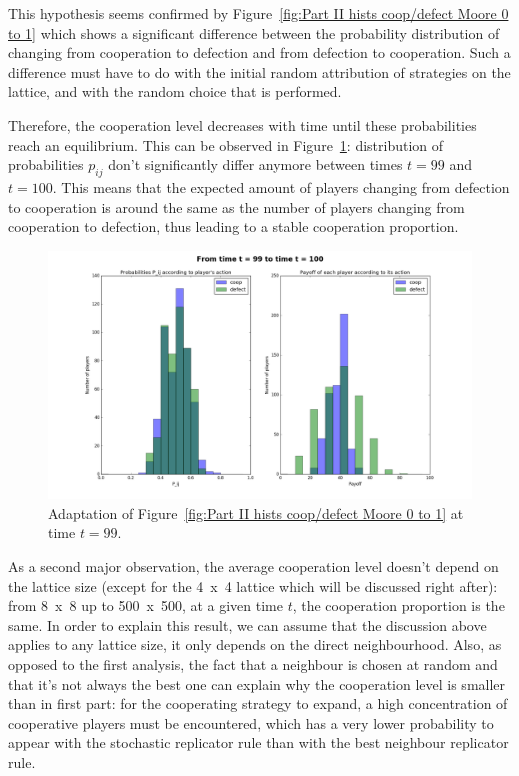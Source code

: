 \documentclass{article}
\begin{document}
This hypothesis seems confirmed by Figure~\ref{fig:Part II hists coop/defect Moore 0 to 1} which shows a
significant difference between the probability distribution of changing from cooperation to defection and
from defection to cooperation. Such a difference must have to do with the initial random attribution of
strategies on the lattice, and with the random choice that is performed.

Therefore, the cooperation level decreases with time until these probabilities reach an equilibrium. This
can be observed in Figure~\ref{fig:Part II hists coop/defect Moore 99 to 100}: distribution of probabilities
$p_{ij}$ don't significantly differ anymore between times $t=99$ and $t=100$. This means that the expected
amount of players changing from defection to cooperation is around the same as the number of players changing
from cooperation to defection, thus leading to a stable cooperation proportion.

\begin{figure}[!h]
\hspace{-1.8cm}
\includegraphics[width=1.2\textwidth]{imgs/part2_diff_coop_defect_99_to_100.png}
\vspace{-1cm}
\caption{Adaptation of Figure~\ref{fig:Part II hists coop/defect Moore 0 to 1} at time $t=99$.
\label{fig:Part II hists coop/defect Moore 99 to 100}}
\end{figure}

As a second major observation, the average cooperation level doesn't depend on the lattice size (except
for the 4~x~4 lattice which will be discussed right after): from 8~x~8 up to 500~x~500, at a given time $t$,
the cooperation proportion is the same. In order to explain this result, we can assume that the discussion
above applies to any lattice size, it only depends on the direct neighbourhood. Also, as opposed to the
first analysis, the fact that a neighbour is chosen at random and that it's not always the best one can
explain why the cooperation level is smaller than in first part: for the cooperating strategy to expand,
a high concentration of cooperative players must be encountered, which has a very lower probability to
appear with the stochastic replicator rule than with the best neighbour replicator rule.
\end{document}
